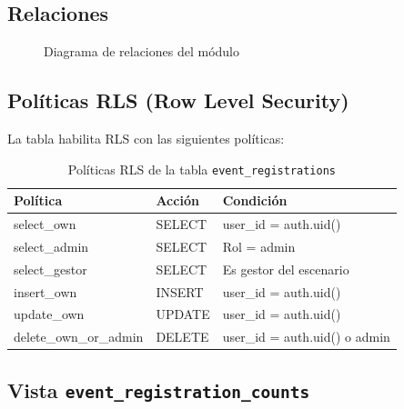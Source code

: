 \documentclass[12pt,letterpaper]{article}
\begin{document}
\subsection{Relaciones}

\begin{figure}[H]
\centering
{}
\caption{Diagrama de relaciones del m\'odulo}
\end{figure}

\subsection{Pol\'iticas RLS (Row Level Security)}

La tabla habilita RLS con las siguientes pol\'iticas:

\begin{table}[H]
\centering
\small
\begin{tabular}{@{}lp{4.5cm}p{4.5cm}@{}}
\toprule
\textbf{Pol\'itica} & \textbf{Acci\'on} & \textbf{Condici\'on} \\
\midrule
select\_own & SELECT & user\_id = auth.uid() \\
select\_admin & SELECT & Rol = admin \\
select\_gestor & SELECT & Es gestor del escenario \\
insert\_own & INSERT & user\_id = auth.uid() \\
update\_own & UPDATE & user\_id = auth.uid() \\
delete\_own\_or\_admin & DELETE & user\_id = auth.uid() o admin \\
\bottomrule
\end{tabular}
\caption{Pol\'iticas RLS de la tabla \texttt{event\_registrations}}
\end{table}

\subsection{Vista \texttt{event\_registration\_counts}}
\end{document}
